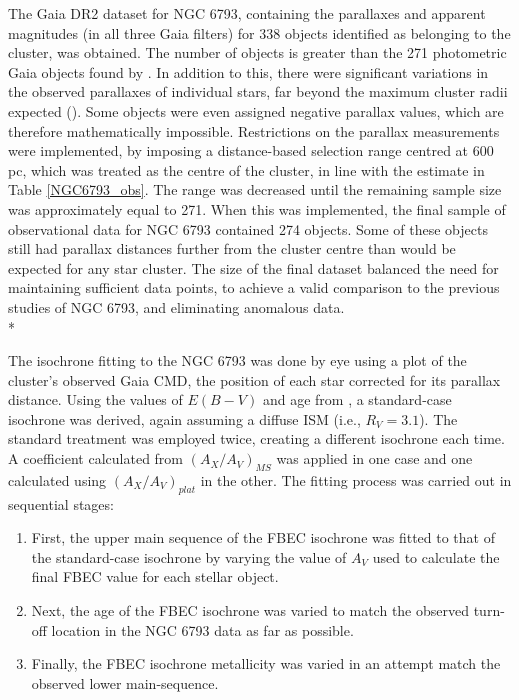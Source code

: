 \documentclass[12pt, a4paper]{report}
\begin{document}
The Gaia DR2 dataset for NGC 6793, containing the parallaxes and apparent magnitudes (in all three Gaia filters) for 338 objects identified as belonging to the cluster, was obtained. The number of objects is greater than the 271 photometric Gaia objects found by \cite{2018A&A...616A..10G}. In addition to this, there were significant variations in the observed parallaxes of individual stars, far beyond the maximum cluster radii expected (\cite{2006A&A...456..523S}). Some objects were even assigned negative parallax values, which are therefore mathematically impossible. Restrictions on the parallax measurements were implemented, by imposing a distance-based selection range centred at 600 pc, which was treated as the centre of the cluster, in line with the \cite{2018A&A...616A..10G} estimate in Table \ref{NGC6793_obs}. The range was decreased until the remaining sample size was approximately equal to 271. When this was implemented, the final sample of observational data for NGC 6793 contained 274 objects. Some of these objects still had parallax distances further from the cluster centre than would be expected for any star cluster. The size of the final dataset balanced the need for maintaining sufficient data points, to achieve a valid comparison to the previous studies of NGC 6793, and eliminating anomalous data.\\*

The isochrone fitting to the NGC 6793 was done by eye using a plot of the cluster's observed Gaia CMD, the position of each star corrected for its parallax distance. Using the values of $E(B-V)$ and age from \cite{2018A&A...616A..10G}, a standard-case isochrone was derived, again assuming a diffuse ISM (i.e., $R_{V} = 3.1$). The standard treatment was employed twice, creating a different isochrone each time. A coefficient calculated from $(A_{X}/A_{V})_{MS}$ was applied in one case and one calculated using $(A_{X}/A_{V})_{plat}$ in the other. The fitting process was carried out in sequential stages:

\begin{enumerate}
\item First, the upper main sequence of the FBEC isochrone was fitted to that of the standard-case isochrone by varying the value of $A_{V}$ used to calculate the final FBEC value for each stellar object.
\item Next, the age of the FBEC isochrone was varied to match the observed turn-off location in the NGC 6793 data as far as possible.
\item Finally, the FBEC isochrone metallicity was varied in an attempt match the observed lower main-sequence.
\end{enumerate}
\end{document}
